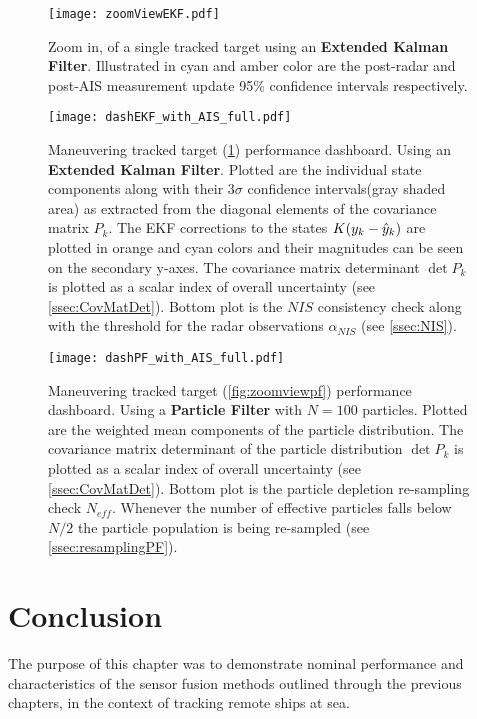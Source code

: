 \begin{figure}[H]
	\centering
	\texttt{[image: zoomViewEKF.pdf]}
	\caption{Zoom in, of a single tracked target using an \textbf{Extended Kalman Filter}. Illustrated in cyan and amber color are the post-radar and post-AIS measurement update 95\% confidence intervals respectively. }
	\label{fig:zoomviewEKF}
\end{figure}



\begin{figure}[H]
	\centering
	\texttt{[image: dashEKF\_with\_AIS\_full.pdf]}
	\caption{Maneuvering tracked target (\cref{fig:zoomviewEKF}) performance dashboard. Using an \textbf{Extended Kalman Filter}. Plotted are the individual state components along with their $3\sigma$ confidence intervals(gray shaded area) as extracted from the diagonal elements of the covariance matrix $P_k$. The EKF corrections to the states $K({{y}}_k - {\hat{{y}}}_k)$ are plotted in orange and cyan colors and their magnitudes can be seen on the secondary y-axes. The covariance matrix determinant $\det{P_k}$ is plotted as a scalar index of overall uncertainty (see \cref{ssec:CovMatDet}). Bottom plot is the $NIS$ consistency check along with the threshold for the radar observations $\alpha_{NIS}$ (see \cref{ssec:NIS}).}
	\label{fig:dashEKF_with_AIS_full}
\end{figure}

\begin{figure}[H]
	\centering
	\texttt{[image: dashPF\_with\_AIS\_full.pdf]}
	\caption{Maneuvering tracked target (\cref{fig:zoomviewpf}) performance dashboard. Using a \textbf{Particle Filter} with $N=100$ particles. Plotted are the weighted mean components of the particle distribution. The covariance matrix determinant of the particle distribution $\det{P_k}$ is plotted as a scalar index of overall uncertainty (see \cref{ssec:CovMatDet}). Bottom plot is the particle depletion re-sampling check $N_{eff}$. Whenever the number of effective particles falls below $N/2$ the particle population is being re-sampled (see \cref{ssec:resamplingPF}).}
	\label{fig:dashPF_with_AIS_full}
\end{figure}

\section{Conclusion}

The purpose of this chapter was to demonstrate nominal performance and characteristics of the sensor fusion methods outlined through the previous chapters, in the context of tracking remote ships at sea. 

